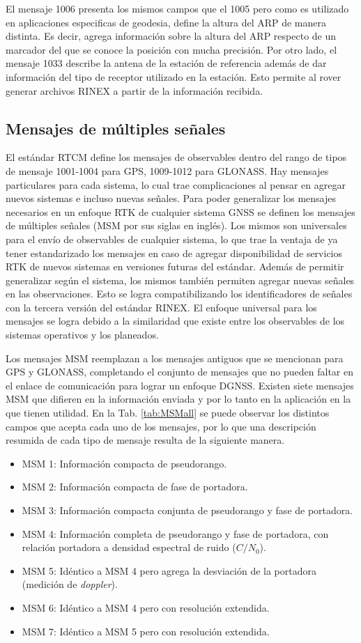 \documentclass[a4paper,12pt,oneside,onecolumn,final,openright]{book}%
\begin{document}
	El mensaje 1006 presenta los mismos campos que el 1005 pero como es utilizado en aplicaciones especificas de geodesia, define la altura del ARP de manera distinta. Es decir, agrega información sobre la altura del ARP respecto de un marcador del que se conoce la posición con mucha precisión. Por otro lado, el mensaje 1033 describe la antena de la estación de referencia además de dar información del tipo de receptor utilizado en la estación. Esto permite al rover generar archivos RINEX \cite{rinex} a partir de la información recibida.
	
\subsection{Mensajes de múltiples señales}
	El estándar RTCM define los mensajes de observables dentro del rango de tipos de mensaje 1001-1004 para GPS, 1009-1012 para GLONASS. Hay mensajes particulares para cada sistema, lo cual trae complicaciones al pensar en agregar nuevos sistemas e incluso nuevas señales. Para poder generalizar los mensajes necesarios en un enfoque RTK de cualquier sistema GNSS se definen los mensajes de múltiples señales (MSM por sus siglas en inglés). Los mismos son universales para el envío de observables de cualquier sistema, lo que trae la ventaja de ya tener estandarizado los mensajes en caso de agregar disponibilidad de servicios RTK de nuevos sistemas en versiones futuras del estándar. Además de permitir generalizar según el sistema, los mismos también permiten agregar nuevas señales en las observaciones. Esto se logra compatibilizando los identificadores de señales con la tercera versión del estándar RINEX. El enfoque universal para los mensajes se logra debido a la similaridad que existe entre los observables de los sistemas operativos y los planeados.
	
	Los mensajes MSM reemplazan a los mensajes antiguos que se mencionan para GPS y GLONASS, completando el conjunto de mensajes que no pueden faltar en el enlace de comunicación para lograr un enfoque DGNSS. Existen siete mensajes MSM que difieren en la información enviada y por lo tanto en la aplicación en la que tienen utilidad. En la Tab. \ref{tab:MSMall} se puede observar los distintos campos que acepta cada uno de los mensajes, por lo que una descripción resumida de cada tipo de mensaje resulta de la siguiente manera.
\begin{itemize}
	\item MSM 1: Información compacta de pseudorango.
	\item MSM 2: Información compacta de fase de portadora.
	\item MSM 3: Información compacta conjunta de pseudorango y fase de portadora.
	\item MSM 4: Información completa de pseudorango y fase de portadora, con relación portadora a densidad espectral de ruido ($C/N_0$).
	\item MSM 5: Idéntico a MSM 4 pero agrega la desviación de la portadora (medición de \textit{doppler}).
	\item MSM 6: Idéntico a MSM 4 pero con resolución extendida.
	\item MSM 7: Idéntico a MSM 5 pero con resolución extendida.
\end{itemize}
\end{document}
